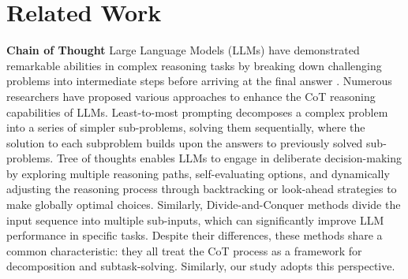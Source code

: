 \section{Related Work}


\textbf{Chain of Thought}
Large Language Models (LLMs) \citep{icl:Brown} have demonstrated remarkable abilities in complex reasoning tasks by breaking down challenging problems into intermediate steps before arriving at the final answer \citep{cot:Wei}. Numerous researchers have proposed various approaches to enhance the CoT reasoning capabilities of LLMs. Least-to-most prompting \citep{least-to-most} decomposes  a complex problem into a series of simpler sub-problems, solving them sequentially, where the solution to each subproblem builds upon the answers to previously solved sub-problems. Tree of thoughts \citep{tree-of-thoughts} enables LLMs to engage in deliberate decision-making by exploring multiple reasoning paths, self-evaluating options, and dynamically adjusting the reasoning process through backtracking or look-ahead strategies to make globally optimal choices. Similarly, Divide-and-Conquer methods \citep{Divide-and-Conquer,dacMultichoice} divide the input sequence into multiple sub-inputs, which can significantly improve LLM performance in specific tasks. Despite their differences, these methods share a common characteristic: they all treat the CoT process as a framework for decomposition and subtask-solving. Similarly, our study adopts this perspective. 


